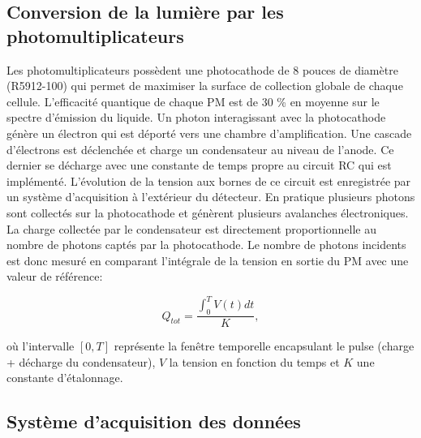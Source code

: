 \subsection{Conversion de la lumière par les photomultiplicateurs} 

Les photomultiplicateurs possèdent une photocathode de 8 pouces de diamètre (R5912-100) qui permet de maximiser la surface de collection globale de chaque cellule. L'efficacité quantique de chaque PM est de 30 \% en moyenne sur le spectre d'émission du liquide. Un photon interagissant avec la photocathode génère un électron qui est déporté vers une chambre d'amplification. Une cascade d'électrons est déclenchée et charge un condensateur au niveau de l'anode. Ce dernier se décharge avec une constante de temps propre au circuit RC qui est implémenté. L'évolution de la tension aux bornes de ce circuit est enregistrée par un système d'acquisition à l'extérieur du détecteur. En pratique plusieurs photons sont collectés sur la photocathode et génèrent plusieurs avalanches électroniques. La charge collectée par le condensateur est directement proportionnelle au nombre de photons captés par la photocathode. Le nombre de photons incidents est donc mesuré en comparant l'intégrale de la tension en sortie du PM avec une valeur de référence: 

\begin{equation} 
Q_{tot} = \frac{\int_{0}^{T} V(t) dt}{K}, 
\label{eq:Qtot_def}
\end{equation} 

\bigbreak 

où l'intervalle $[0,T]$ représente la fenêtre temporelle encapsulant le pulse (charge + décharge du condensateur), $V$ la tension en fonction du temps et $K$ une constante d'étalonnage.\\ 


\bigbreak 


\subsection{Système d'acquisition des données} 
\label{sec:stereo_elec} 

